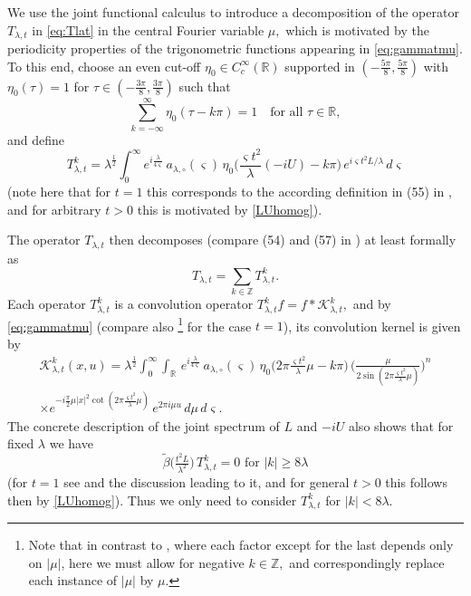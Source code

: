 \documentclass[leqno]{amsart}
\theoremstyle{definition}
\theoremstyle{remark}
\numberwithin{equation}{section}
\newcommand{\R}{\mathbb{R}}
\newcommand{\Z}{\mathbb{Z}}
\newcommand\la{{\lambda}}
\newcommand\sK{{\mathscr {K}}}
\begin{document}
We use the joint functional calculus to introduce a decomposition of the operator
$T_{\la,t}$ in \eqref{eq:Tlat} in the central Fourier variable $\mu,$ which is motivated by the periodicity properties of the trigonometric functions appearing in \eqref{eq:gammatmu}. 
 To this end, choose an even cut-off  $\eta_0\in C_c^{\infty}(\R)$ supported in ${(-\frac{5 \pi}{8}, \frac{5 \pi}{8})}$ with $\eta_0(\tau) = 1$ for ${\tau \in(-\frac{3 \pi}{8}, \frac{3 \pi}{8})}$ such that
\[
\sum_{k=-\infty}^\infty \eta_0(\tau-k\pi) = 1 \quad \text{for all }\tau\in \R ,
\]
and define \begin{equation} \label{Tklat-definition}
T_{\lambda,t}^{k}  = \lambda^{\frac 12} \int_0^\infty e^{i \frac{\lambda}{ 4 \varsigma}} \, a_{\lambda,\circ}(\varsigma) \, \eta_0\Big(\frac{\varsigma t^2}{\lambda}(-iU)-k \pi\Big) \, e^{i \varsigma t^2 L / \lambda} \, d\varsigma
\end{equation}
(note here that for $t=1$ this corresponds to the according definition in (55) in \cite{MuellerSeeger2015}, and for arbitrary $t>0$ this is motivated by \eqref{LUhomog}).


The operator $ T_{\la,t}$ then decomposes (compare (54) and (57) in  \cite{MuellerSeeger2015}) at least formally  as 
$$
 T_{\la,t} =\sum_{k\in\Z}  T^k_{\la,t}.
$$
Each operator $ T^{k} _{\la,t}$ is a convolution operator $T^{k}_{\la,t}f=f*\sK_{\la,t}^k,$ and 
by  \eqref{eq:gammatmu} (compare also \cite[(57)]{MuellerSeeger2015}\footnote{Note that in  contrast to \cite[(57)]{MuellerSeeger2015}, where each factor except for the last depends only on $|\mu|$, here we must allow for  negative $k\in\Z,$ and correspondingly  replace each instance of $|\mu|$ by $\mu$.} for the case $t=1$), its convolution kernel is given by 
\begin{multline}
\sK_{\la,t}^k(x,u)=\lambda^{\frac 12} \int_0^\infty \int_\R \,  e^{i \frac{\lambda}{ 4 \varsigma}}\,  a_{\lambda,\circ}(\varsigma) \, \eta_0\big(2\pi\tfrac{\varsigma t^2 }{\lambda}\mu-k \pi\big)\, \Big(\frac {\mu}{2\sin (2\pi \frac{\varsigma t^2}{\lambda}\mu)}\Big)^{n}\\
\times e^{-i\frac {\pi}2 \mu |x|^2\cot(2\pi \frac{\varsigma t^2}{\lambda} \mu) } 
  \, e^{2\pi i\mu u} \,d\mu\, d\varsigma. \label{Kklat}
\end{multline}
The concrete description of the joint spectrum of $L$ and $-iU$ also shows that 
for fixed $\la$ we  have
\begin{equation} \widetilde \beta\big(\tfrac{t^2L}{\la^2}) \, T^k_{\la,t} = 0 \text{ for }|k|\ge 8\la 
\end{equation} (for $t=1$ see \cite[(56)]{MuellerSeeger2015} and the discussion leading to it, and for general $t>0$ this follows then by \eqref{LUhomog}). Thus we only need to consider  $T^k_{\la,t}$ for $|k|<8\la.$
\smallskip
\end{document}
